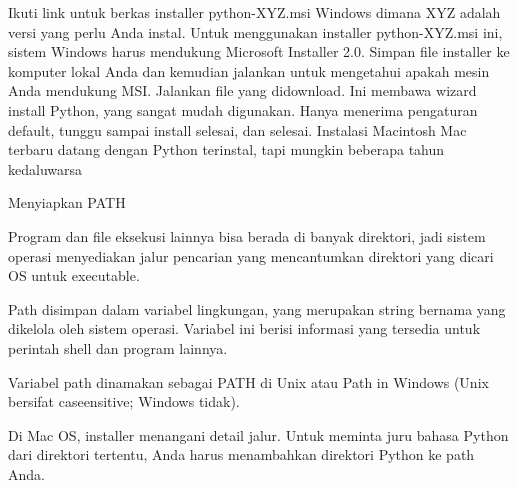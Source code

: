 \documentclass[a4paper,12pt]{report}
\begin{document}
\noindent 
{\fontsize{14pt}{14pt}\selectfont \vspace{\baselineskip}
Ikuti link untuk berkas installer python-XYZ.msi Windows dimana XYZ adalah versi yang perlu Anda instal. Untuk menggunakan installer python-XYZ.msi ini, sistem Windows harus mendukung Microsoft Installer 2.0. Simpan file installer ke komputer lokal Anda dan kemudian jalankan untuk mengetahui apakah mesin Anda mendukung MSI. Jalankan file yang didownload. Ini membawa wizard install Python, yang sangat mudah digunakan. Hanya menerima pengaturan default, tunggu sampai install selesai, dan selesai. Instalasi Macintosh Mac terbaru datang dengan Python terinstal, tapi mungkin beberapa tahun kedaluwarsa \\} \par
\noindent 
{\fontsize{14pt}{14pt}\selectfont Menyiapkan PATH \\} \par
\noindent 
{\fontsize{14pt}{14pt}\selectfont Program dan file eksekusi lainnya bisa berada di banyak direktori, jadi sistem operasi menyediakan jalur pencarian yang mencantumkan direktori yang dicari OS untuk executable. \\} \par
\vspace{14pt}
\noindent 
{\fontsize{14pt}{14pt}\selectfont Path disimpan dalam variabel lingkungan, yang merupakan string bernama yang dikelola oleh sistem operasi. Variabel ini berisi informasi yang tersedia untuk perintah shell dan program lainnya. \\} \par
\vspace{14pt}
\noindent 
{\fontsize{14pt}{14pt}\selectfont Variabel path dinamakan sebagai PATH di Unix atau Path in Windows (Unix bersifat caseensitive; Windows tidak). \\} \par
\vspace{14pt}
\noindent 
{\fontsize{14pt}{14pt}\selectfont Di Mac OS, installer menangani detail jalur. Untuk meminta juru bahasa Python dari direktori tertentu, Anda harus menambahkan direktori Python ke path Anda. \\} \par
\vspace{14pt}
\noindent 
\end{document}
